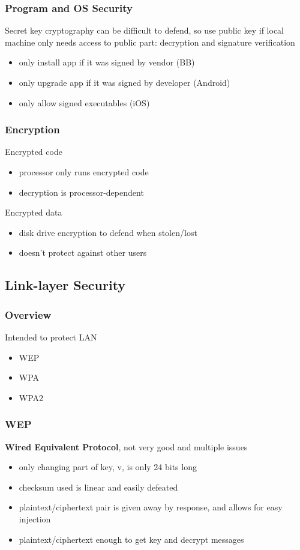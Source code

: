 \documentclass[]{article}
\theoremstyle{definition}
\begin{document}
	\subsubsection{Program and OS Security}
	Secret key cryptography can be difficult to defend, so use public key if local machine only needs access to public part: decryption and signature verification
	\begin{itemize}
		\item only install app if it was signed by vendor (BB)
		\item only upgrade app if it was signed by developer (Android)
		\item only allow signed executables (iOS)
	\end{itemize}
	\subsubsection{Encryption}
	Encrypted code
	\begin{itemize}
		\item processor only runs encrypted code
		\item decryption is processor-dependent
	\end{itemize}
	Encrypted data
	\begin{itemize}
		\item disk drive encryption to defend when stolen/lost
		\item doesn't protect against other users
	\end{itemize}

	\subsection{Link-layer Security}
	\subsubsection{Overview}
	Intended to protect LAN
	\begin{itemize}
		\item WEP
		\item WPA
		\item WPA2
	\end{itemize}

	\subsubsection{WEP}
	\textbf{Wired Equivalent Protocol}, not very good and multiple issues
	\begin{itemize}
		\item only changing part of key, v, is only 24 bits long
		\item checksum used is linear and easily defeated
		\item plaintext/ciphertext pair is given away by response, and allows for easy injection
		\item plaintext/ciphertext enough to get key and decrypt messages
	\end{itemize}
\end{document}
